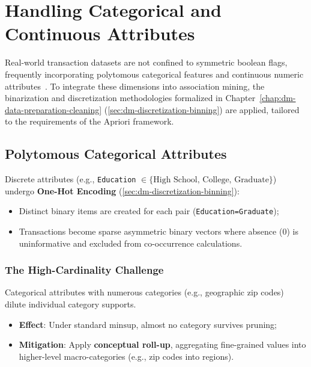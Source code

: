 \section{Handling Categorical and Continuous Attributes}
\label{sec:dm-categorical-continuous-attributes}

Real-world transaction datasets are not confined to symmetric boolean flags, frequently incorporating polytomous categorical features and continuous numeric attributes~\cite{tan2018}. To integrate these dimensions into association mining, the binarization and discretization methodologies formalized in Chapter~\ref{chap:dm-data-preparation-cleaning} (\autoref{sec:dm-discretization-binning}) are applied, tailored to the requirements of the Apriori framework.

\subsection{Polytomous Categorical Attributes}
Discrete attributes (e.g., \texttt{Education} $\in \{\text{High School, College, Graduate}\}$) undergo \textbf{One-Hot Encoding} (\autoref{sec:dm-discretization-binning}):
\begin{itemize}
    \item Distinct binary items are created for each pair (\texttt{Education=Graduate});
    \item Transactions become sparse asymmetric binary vectors where absence (0) is uninformative and excluded from co-occurrence calculations.
\end{itemize}

\subsubsection{The High-Cardinality Challenge}
Categorical attributes with numerous categories (e.g., geographic zip codes) dilute individual category supports.
\begin{itemize}
    \item \textbf{Effect}: Under standard $\mathrm{minsup}$, almost no category survives pruning;
    \item \textbf{Mitigation}: Apply \textbf{conceptual roll-up}, aggregating fine-grained values into higher-level macro-categories (e.g., zip codes into regions).
\end{itemize}

